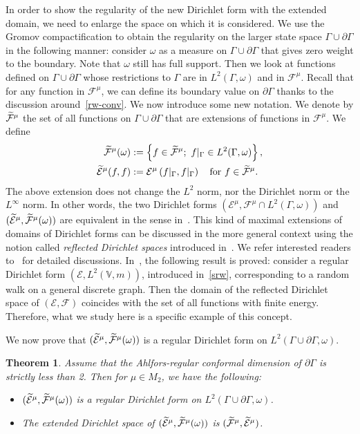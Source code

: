 \documentclass[10pt]{amsart}
\newtheorem{theo}{Theorem}[section]
\theoremstyle{definition}\newtheorem{defi}[theo]{Definition}\newtheorem{rema}[theo]{Remark}\newtheorem{exam}[theo]{Example}\newtheorem{exem}[theo]{Example}\newtheorem{nota}[theo]{Notation}
\newcommand{\ce}{\mathcal{E}}
\newcommand{\cf}{\mathcal{F}}
\newcommand{\bv}{\mathbb{V}}
\let\oldtilde\tilde
\renewcommand*{\tilde}[1]{\mathchoice{\widetilde{#1}}{\widetilde{#1}}{\oldtilde{#1}}{\oldtilde{#1}}}
\begin{document}
In order to show the regularity of the new Dirichlet form with the extended domain, we need to enlarge the space on which it is considered. We use the Gromov compactification to obtain the regularity on the larger state space $\Gamma\cup\partial\Gamma$ in the following manner: consider $\omega$ as a measure on $\Gamma\cup\partial\Gamma$ that gives zero weight to the boundary. Note that $\omega$ still has full support. Then we look at functions defined on $\Gamma\cup\partial\Gamma$ whose restrictions to $\Gamma$ are in $L^2(\Gamma,\omega)$ and in $\cf^{\mu}$. Recall that for any function in $\cf^{\mu}$, we can define its boundary value on $\partial\Gamma$ thanks to the discussion around~\eqref{rw-conv}. We now introduce some new notation. We denote by $\tilde\cf^{\mu}$ the set of all functions on $\Gamma\cup\partial\Gamma$ that are extensions of functions in $\cf^{\mu}$. We define
\begin{align*}
\tilde\cf^{\mu}(\omega)&:=
\left\{f\in\tilde\cf^{\mu} ;\ f|_{\Gamma}\in L^2(\Gamma,\omega)\right\},\\
\tilde\ce^{\mu}(f,f)&:=\ce^{\mu}\left(f|_{\Gamma},f|_{\Gamma}\right)\quad \text{for}\ f\in\tilde\cf^{\mu}.
\end{align*}
The above extension does not change the $L^2$ norm, nor the Dirichlet norm or the $L^{\infty}$ norm. In other words, the two Dirichlet forms $(\ce^{\mu}, \cf^{\mu}\cap L^2(\Gamma,\omega))$ and $(\tilde\ce^{\mu}, \tilde\cf^{\mu}(\omega))$ are equivalent in the sense in~\cite[Appendix~A.4, p.~422]{FOT}. This kind of maximal extensions of domains of Dirichlet forms can be discussed in the more general context using the notion called \emph{reflected Dirichlet spaces} introduced in~\cite{Ch1}. We refer interested readers to~\cite[Chapter~6]{CF} for detailed discussions. In~\cite[Section~6.5]{CF}, the following result is proved: consider a regular Dirichlet form $(\ce,L^2(\bv,m))$, introduced in~\eqref{srw}, corresponding to a random walk on a general discrete graph. Then the domain of the reflected Dirichlet space of $(\ce,\cf)$ coincides with the set of all functions with finite energy. Therefore, what we study here is a specific example of this concept.


We now prove that $(\tilde\ce^{\mu}, \tilde\cf^{\mu}(\omega))$ is a regular Dirichlet form on $L^2(\Gamma\cup\partial\Gamma,\omega)$.



\begin{theo}\label{w}
Assume that the Ahlfors-regular conformal dimension of $\partial\Gamma$ is strictly less than 2. Then for $\mu\in M_2$, we have the following:
\begin{itemize}
\item $(\tilde\ce^{\mu}, \tilde\cf^{\mu}(\omega))$ is a regular Dirichlet form on $L^2(\Gamma\cup\partial\Gamma,\omega)$.
\item The extended Dirichlet space of $(\tilde\ce^{\mu},
\tilde\cf^{\mu}(\omega))$ is $(\tilde{\cf}^{\mu},\tilde{\ce}^{\mu})$.
\end{itemize}
\end{theo}
\end{document}
